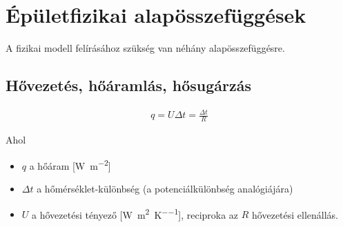 \begin{table}[H]
	\footnotesize
	\centering
	\caption{A helyiség modelljének elemei}
	\renewcommand{\arraystretch}{2} %
	
	
	
	
	
	\label{table_house_parameters}
	
	
\end{table}

\begin{table}[H]
	\footnotesize
	\centering
	\caption{Jelölések}
	
	\label{tab:Nomenclature}
\end{table}
\section{Épületfizikai alapösszefüggések}
 
 A fizikai modell felírásához szükség van néhány alapösszefüggésre.
 
 \vspace{18pt}
 
\subsection*{Hővezetés, hőáramlás, hősugárzás}

\begin{equation} \label{eq_hoaram_alap}
\begin{aligned}
q = U\Delta t = \frac{\Delta t}{R}
\end{aligned}
\end{equation}

Ahol 

\begin{itemize}[itemsep=6pt,topsep=0pt,parsep=0pt,partopsep=0pt]
	\item[] $q$ a hőáram [\si[per-mode=fraction]{\watt\per\metre\squared}]
	\item[] $\Delta t$ a hőmérséklet-különbség (a potenciálkülönbség analógiájára)
	\item[] $U$ a hővezetési tényező [\si[per-mode=fraction]{\watt\per\metre\squared\per\kelvin}], reciproka az $R$ hővezetési ellenállás.
\end{itemize}


